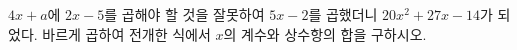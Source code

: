 $4x+a$에 $2x-5$를 곱해야 할 것을 잘못하여 $5x-2$를 곱했더니 $20x^2+27x-14$가 되었다. 바르게 곱하여 전개한 식에서 $x$의 계수와 상수항의 합을 구하시오. 
